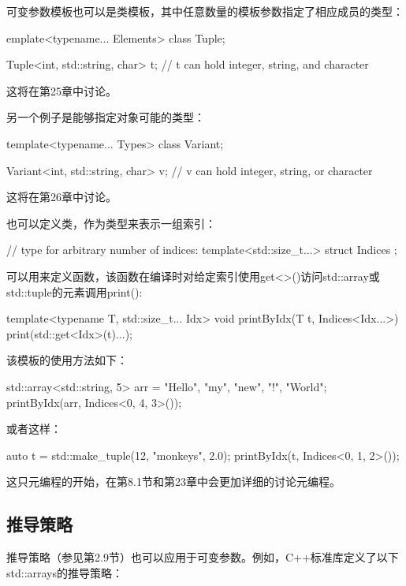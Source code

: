 可变参数模板也可以是类模板，其中任意数量的模板参数指定了相应成员的类型：

\begin{cpp}
emplate<typename... Elements>
class Tuple;

Tuple<int, std::string, char> t; // t can hold integer, string, and character
\end{cpp}

这将在第25章中讨论。

另一个例子是能够指定对象可能的类型：

\begin{cpp}
template<typename... Types>
class Variant;

Variant<int, std::string, char> v; // v can hold integer, string, or character
\end{cpp}

这将在第26章中讨论。

也可以定义类，作为类型来表示一组索引：

\begin{cpp}
// type for arbitrary number of indices:
template<std::size_t...>
struct Indices {
};
\end{cpp}

可以用来定义函数，该函数在编译时对给定索引使用get<>()访问std::array或std::tuple的元素调用print():

\begin{cpp}
template<typename T, std::size_t... Idx>
void printByIdx(T t, Indices<Idx...>)
{
	print(std::get<Idx>(t)...);
}
\end{cpp}

该模板的使用方法如下：

\begin{cpp}
std::array<std::string, 5> arr = {"Hello", "my", "new", "!", "World"};
printByIdx(arr, Indices<0, 4, 3>());
\end{cpp}

或者这样：

\begin{cpp}
auto t = std::make_tuple(12, "monkeys", 2.0);
printByIdx(t, Indices<0, 1, 2>());
\end{cpp}

这只元编程的开始，在第8.1节和第23章中会更加详细的讨论元编程。

\subsection{推导策略}

推导策略（参见第2.9节）也可以应用于可变参数。例如，C++标准库定义了以下std::arrays的推导策略：

